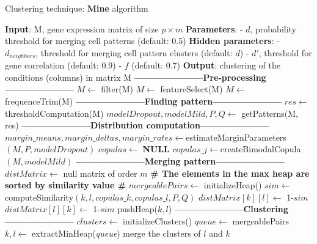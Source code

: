 \documentclass{report}
\begin{document}
\begin{algorithm}[H]
\caption{Clustering technique: \textbf{Mine} algorithm}
\begin{algorithmic}
\STATE \textbf{Input}: M, gene expression matrix of size $p \times m$
\STATE \textbf{Parameters}: 
\STATE - $d$, probability threshold for merging cell patterns (default: 0.5)
\STATE \textbf{Hidden parameters}: 
\STATE - $d_{neighbors}$, threshold for merging cell pattern clusters (default: $d$)
\STATE - $d'$, threshold for gene correlation (default: $0.9$)
\STATE - $f$ (default: $0.7$)
\STATE \textbf{Output}: clustering of the conditions (columns) in matrix M
\STATE \textbf{---------------------Pre-processing---------------------}
\STATE $M \leftarrow$ filter(M)
\STATE $M \leftarrow$ featureSelect(M)
\STATE $M \leftarrow$ frequenceTrim(M)
\STATE \textbf{---------------------Finding pattern---------------------}
\STATE $res \leftarrow$ thresholdComputation(M)
\STATE $modelDropout, modelMild, P, Q \leftarrow$ getPatterns(M, res)
\STATE \textbf{---------------------Distribution computation---------------------}
\STATE $margin\_means, margin\_deltas, margin\_rates \leftarrow $estimateMarginParameters$(M, P, modelDropout)$
\STATE $copulas \leftarrow$ \textbf{NULL}
\STATE $copulas\_j \leftarrow $createBimodalCopula$(M, modelMild)$
\ENDFOR
\STATE \textbf{---------------------Merging pattern---------------------}
\STATE $distMatrix \leftarrow$ null matrix of order $m$
\STATE \textbf{\# The elements in the max heap are sorted by similarity value \#}
\STATE $mergeablePairs \leftarrow$ initializeHeap()
\STATE $sim \leftarrow $computeSimilarity$(k, l, copulas\_k, copulas\_l, P, Q)$
\STATE $distMatrix[k][l] \leftarrow$ 1-$sim$
\STATE $distMatrix[l][k] \leftarrow$ 1-$sim$
\STATE pushHeap($k,l$)
\ENDIF
\ENDFOR
\ENDFOR
\STATE \textbf{---------------------Clustering---------------------}
\STATE $clusters \leftarrow$ initializeClusters()
\STATE $queue \leftarrow$ mergeablePairs\\
\STATE $k,l \leftarrow$ extractMinHeap(\textit{queue})
\STATE merge the clusters of $l$ and $k$
\ENDIF
\ENDIF
\ENDWHILE
\ENDWHILE
{}
\end{algorithmic}
\end{algorithm}
\end{document}
